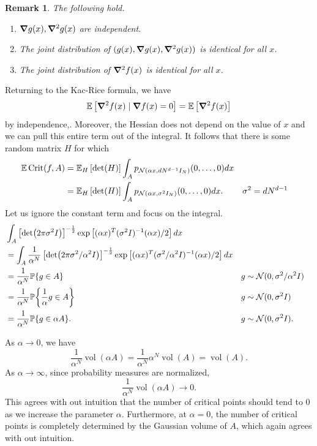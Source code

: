 \documentclass[12pt]{article}
\newtheorem{remark}[theorem]{Remark}
\DeclarePairedDelimiter{\set}{\lbrace}{\rbrace}
\let\abs\relax
\DeclarePairedDelimiter{\abs}{\lvert}{\rvert}
\DeclareMathOperator{\Crit}{Crit}
\DeclareMathOperator{\vol}{vol}
\newcommand{\E}{\mathbb{E}}
\renewcommand{\P}{\mathbb{P}}
\newcommand{\mcal}{\mathcal}
\begin{document}
\begin{remark}
  The following hold.
  \begin{enumerate}
    \item $\grad g(x), \grad^2 g(x)$ are independent.
    \item The joint distribution of $(g(x), \grad g(x), \grad^2 g(x))$
      is identical for all $x$.
    \item The joint distribution of $\grad^2 f(x)$
      is identical for all $x$.
  \end{enumerate}
\end{remark}

Returning to the Kac-Rice formula,
we have
\[
  \E\left[ \grad^2 f(x)\mid \grad f(x)=0 \right]
  = \E\left[ \grad^2 f(x) \right]
\]
by independence,.
Moreover,
the Hessian does not depend on the value of $x$
and we can pull this entire term out of the integral.
It follows that there is some random matrix $H$ for which
\begin{align*}
  \E \Crit(f, A)
  &= \E_H \left[ \abs{\det(H)} \right] \int_A p_{\mcal N(\alpha x, dN^{d-1} I_N)} (0, \dots, 0) dx \\
  &= \E_H \left[ \abs{\det(H)} \right] \int_A p_{\mcal N(\alpha x, \sigma^2 I_N)} (0, \dots, 0) dx. &&\sigma^2 = dN^{d-1}
\end{align*}
Let us ignore the constant term and focus on the integral.
\begin{align*}
  &\int_A \left[ \det(2\pi \sigma^2 I) \right]^{-\frac12} \exp\left[ (\alpha x)^T (\sigma^2 I)^{-1} (\alpha x) / 2 \right] dx \\
  &= \int_A \frac1{\alpha^N} \left[ \det(2\pi \sigma^2/\alpha^2 I) \right]^{-\frac12} \exp\left[ (\alpha x)^T (\sigma^2/\alpha^2 I)^{-1} (\alpha x) / 2 \right] dx \\
  &= \frac1{\alpha^N} \P\set{g\in A} &&g\sim \mcal N(0, \sigma^2/\alpha^2 I) \\
  &= \frac1{\alpha^N} \P\set*{\frac1\alpha g\in A} &&g\sim \mcal N(0, \sigma^2 I) \\
  &= \frac1{\alpha^N} \P\set{g\in \alpha A}. &&g\sim \mcal N(0, \sigma^2 I).
\end{align*}

As $\alpha \to 0$,
we have
\[
  \frac1{\alpha^N} \vol(\alpha A)
  = \frac1{\alpha^N} \alpha^N \vol(A)
  = \vol(A).
\]
As $\alpha\to \infty$,
since probability measures are normalized,
\[
  \frac1{\alpha^N} \vol(\alpha A)
  \to 0.
\]
This agrees with out intuition that the number of critical points should tend to 0
as we increase the parameter $\alpha$.
Furthermore,
at $\alpha=0$,
the number of critical points is completely determined by the Gaussian volume of $A$,
which again agrees with out intuition.
\end{document}
